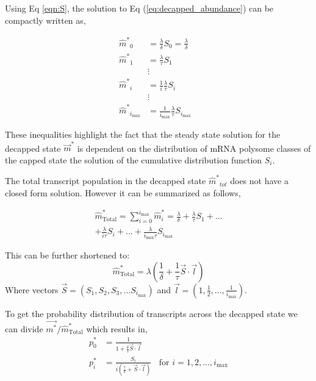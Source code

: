 \documentclass[10pt,letterpaper]{article}
\newcommand{\imax}{\ensuremath{{i_{\max}}}\xspace}
\newcommand{\mhat}{\ensuremath{\hat{m}}\xspace}
\newcommand{\mhatstar}{\ensuremath{\mhat^{*}}\xspace}
\newcommand{\mhatstari}{\ensuremath{\mhat^{*}_i}\xspace}
\newcommand{\mvec}{\ensuremath{\vec{m}}\xspace}
\newcommand{\mvecstar}{\ensuremath{\mvec^*}\xspace}
\newcommand{\msumstar}{\ensuremath{\hat{m}^*_{\text{Total}}}\xspace}
\begin{document}
Using Eq \ref{eqn:S},  the solution to Eq (\ref{eq:decapped_abundance}) can be compactly written as,

\begin{align}
  \label{eq:decapped_solution} 
  \mhatstar_0  &= \frac{\lambda}{\delta}S_{0}=\frac{\lambda}{\delta} \nonumber \\
  \mhatstar_1  &= \frac{\lambda}{\tau}S_{1} \nonumber \\
               & \vdots &  \\
  \mhatstar_i  &= \frac{1}{i}\frac{\lambda}{\tau}S_{i}  \nonumber \\
               & \vdots & \nonumber \\
  \mhatstar_{\imax}  &= \frac{1}{\imax}\frac{\lambda}{\tau}S_{\imax}  \nonumber
\end{align}

These inequalities highlight the fact that the steady state solution for the decapped state \mvecstar is dependent on the distribution of mRNA polysome classes of the capped state the solution of the cumulative distribution function $S_i$. %

The total transcript population in the decapped state $\mhatstar_{tot}$ does not have a closed form solution.
However it can be summarized as follows,


\begin{align*}
  \msumstar = \sum_{i=0}^{\imax} \mhatstari = \frac{\lambda}{\delta} + \frac{\lambda}{\tau}S_{1}+ \hdots \\
  + \frac{\lambda}{i \tau}S_{i} + \hdots  + \frac{\lambda}{\imax \tau}S_{\imax} 
\end{align*}

This can be further shortened to:
\begin{equation} \label{eq: marked_total_pop}
  \msumstar = \lambda(\frac{1}{\delta} + \frac{1}{\tau}\vec{S} \cdot \vec{l}	) 
\end{equation}
Where vectors $\vec{S} = \left(S_{1}, S_{2}, S_{3},\ldots S_{\imax}\right)$ and $\vec{l} = \left(1, \frac{1}{2},...,\frac{1}{\imax}\right)$. 


To get the probability distribution of transcripts across the decapped state we can divide $\vec{m^{*}}/\msumstar$ which results in,
\begin{align}\label{eq:decapped_distribution}
  p_{0}^{*} &= \frac{1}{1 + \frac{\delta}{\tau}\vec{S} \cdot \vec{l}}	\\
  p_{i}^{*} &= \frac{S_{i}}{i(\frac{\tau}{\delta} + \vec{S} \cdot \vec{l})}	\:\:\:\: \text{for } i=1, 2, ..., \imax
\end{align}
\end{document}

